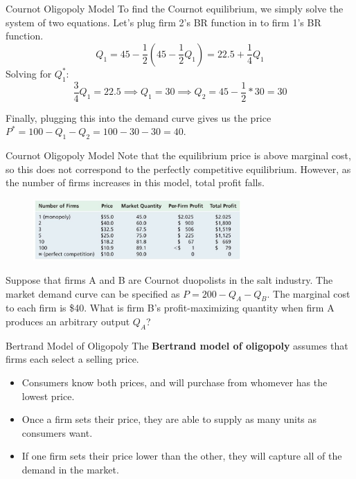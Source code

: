 \documentclass[11pt,t]{beamer}
\begin{document}
\begin{frame}{Cournot Oligopoly Model}
  To find the Cournot equilibrium, we simply solve the system of two equations. Let's plug firm 2's BR function in to firm 1's BR function.
  $$
    Q_1 = 45 - \frac{1}{2} (45 - \frac{1}{2} Q_1) = 22.5 + \frac{1}{4} Q_1
  $$
  Solving for $Q_1^*$:
  $$
    \frac{3}{4}Q_1 = 22.5 \implies Q_1 = 30 \implies Q_2 = 45 - \frac{1}{2} * 30 = 30
  $$
  
  Finally, plugging this into the demand curve gives us the price $P^* = 100 - Q_1 - Q_2 = 100 - 30 - 30 = 40$.
\end{frame}

\begin{frame}{Cournot Oligopoly Model}
  Note that the equilibrium price is above marginal cost, so this does not correspond to the perfectly competitive equilibrium. However, as the number of firms increases in this model, total profit falls.

  \begin{figure}
    \includegraphics[width=300px]{figures/table13_4.jpg}
  \end{figure}
\end{frame}

\begin{frame}{}
  Suppose that firms A and B are Cournot duopolists in the salt industry.  The market demand curve can be specified as $P = 200 - Q_A - Q_B$.  The marginal cost to each firm is \$40. What is firm B's profit-maximizing quantity when firm A produces an arbitrary output $Q_A$?
\end{frame}

\begin{frame}{Bertrand Model of Oligopoly}
  The \textbf{Bertrand model of oligopoly} assumes that firms each select a selling price.

  \begin{itemize}
    \item Consumers know both prices, and will purchase from whomever has the lowest price.
    \item Once a firm sets their price, they are able to supply as many units as consumers want.
    \item If one firm sets their price lower than the other, they will capture all of the demand in the market.
  \end{itemize}
\end{frame}
\end{document}
